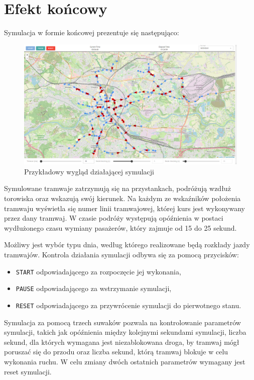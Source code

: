 \documentclass[12pt,a4paper]{article}
\begin{document}
    \section{Efekt końcowy}
        Symulacja w formie końcowej prezentuje się następująco:
        \begin{figure}[H]
            \centering
            \includegraphics[width=\textwidth]{final_efect.png}
            \caption{Przykładowy wygląd działającej symulacji}
        \end{figure}

        Symulowane tramwaje zatrzymują się na przystankach, podróżują wzdłuż torowiska oraz wskazują swój kierunek. Na każdym ze wskaźników położenia tramwaju wyświetla się numer linii tramwajowej, której kurs jest wykonywany przez dany tramwaj. W czasie podróży występują opóźnienia w postaci wydłużonego czasu wymiany pasażerów, który zajmuje od 15 do 25 sekund.

        Możliwy jest wybór typu dnia, według którego realizowane będą rozkłady jazdy tramwajów. Kontrola działania symulacji odbywa się za pomocą przycisków:
        \begin{itemize}
            \item \texttt{START} odpowiadającego za rozpoczęcie jej wykonania,
            \item \texttt{PAUSE} odpowiadającego za wstrzymanie symulacji,
            \item \texttt{RESET} odpowiadającego za przywrócenie symulacji do pierwotnego stanu.
        \end{itemize}

        Symulacja za pomocą trzech suwaków pozwala na kontrolowanie parametrów symulacji, takich jak opóźnienia między kolejnymi sekundami symulacji, liczba sekund, dla których wymagana jest niezablokowana droga, by tramwaj mógł poruszać się do przodu oraz liczba sekund, którą tramwaj blokuje w celu wykonania ruchu. W celu zmiany dwóch ostatnich parametrów wymagany jest reset symulacji.
\end{document}
